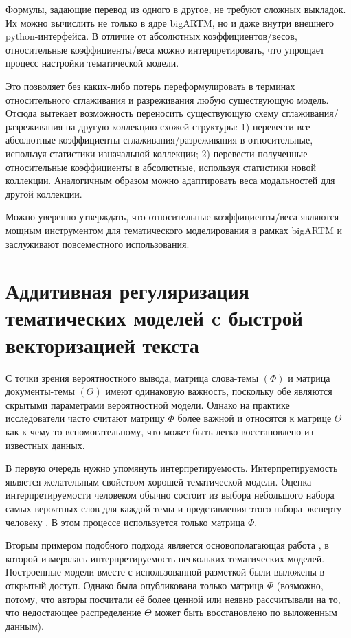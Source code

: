Формулы, задающие перевод из одного в другое, не требуют сложных выкладок. Их можно вычислить не только в ядре bigARTM, но и даже внутри внешнего python-интерфейса.  В отличие от абсолютных коэффициентов/весов,  относительные коэффициенты/веса можно интерпретировать, что упрощает процесс настройки тематической модели.

Это позволяет без каких-либо потерь переформулировать в терминах относительного сглаживания и разреживания любую существующую модель. Отсюда вытекает возможность переносить существующую схему сглаживания/разреживания на другую коллекцию схожей структуры: 1) перевести все абсолютные коэффициенты сглаживания/разреживания в относительные, используя статистики изначальной коллекции; 2) перевести полученные относительные коэффициенты в абсолютные, используя статистики новой коллекции. Аналогичным образом можно адаптировать веса модальностей для другой коллекции.

Можно уверенно утверждать, что относительные коэффициенты/веса являются мощным инструментом для тематического моделирования в рамках bigARTM и заслуживают повсеместного использования.



\section{Аддитивная регуляризация тематических моделей c быстрой векторизацией текста}

С точки зрения вероятностного вывода, матрица слова-темы $(\Phi)$ и матрица документы-темы $(\Theta)$ имеют одинаковую важность, поскольку обе являются скрытыми параметрами вероятностной модели. Однако на практике исследователи часто считают матрицу $\Phi$ более важной и относятся к матрице $\Theta$ как к чему-то вспомогательному, что может быть легко восстановлено из известных данных.

В первую очередь нужно упомянуть интерпретируемость. Интерпретируемость является желательным свойством хорошей тематической модели. Оценка интерпретируемости человеком обычно состоит из выбора небольшого набора самых вероятных слов для каждой темы и представления этого набора эксперту-человеку \cite{roder2015exploring}. В этом процессе используется только матрица $\Phi$.

Вторым примером подобного подхода является основополагающая работа \cite{rtl}, в которой измерялась интерпретируемость нескольких тематических моделей. Построенные модели вместе с использованной разметкой были выложены в открытый доступ. Однако была опубликована только матрица $\Phi$ (возможно, потому, что авторы посчитали её более ценной или неявно рассчитывали на то, что недостающее распределение $\Theta$ может быть восстановлено по выложенным данным).

